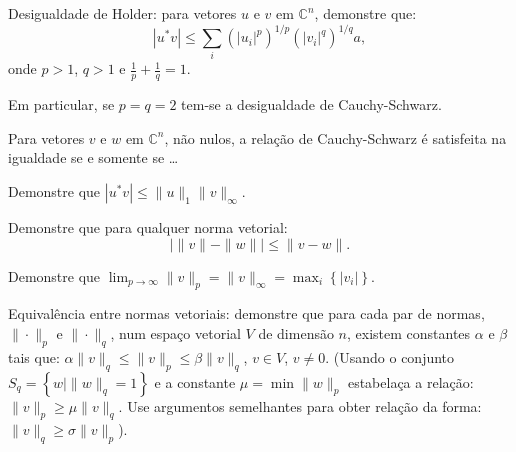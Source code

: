 \documentclass[a4paper,12pt, leqno, answers]{exam}
\begin{document}
\thispagestyle{headandfoot}
\begin{questions}
     Desigualdade de Holder: para vetores $u$ e $v$ em $\mathbb{C}^n$, demonstre que:
    \[
    | u^* v | \leq \sum_i \left( | u_i |^p \right)^{1/p} \left( | v_i |^q \right)^{1/q}a,
    \]
    onde $p > 1$, $q > 1$ e $\frac{1}{p} + \frac{1}{q} = 1$.
    \begin{solution}
        
    \end{solution}

    Em particular, se $p = q = 2$ tem-se a desigualdade de Cauchy-Schwarz.
    \begin{solution}
        
    \end{solution}

    \question Para vetores $v$ e $w$ em $\mathbb{C}^n$, n\~{a}o nulos, a rela\c{c}\~{a}o de Cauchy-Schwarz \'{e} satisfeita na igualdade se e somente se \dots
    \begin{solution}
        
    \end{solution}

    \question Demonstre que $| u^* v | \leq \| u \|_1 \| v \|_\infty$.
    \begin{solution}
        
    \end{solution}

    \question Demonstre que para qualquer norma vetorial:
    \[
    | \| v \| - \| w \| | \leq \| v - w \|.
    \]
    \begin{solution}
        
    \end{solution}

    \question Demonstre que $\lim_{p \rightarrow \infty} \| v \|_p = \| v \|_\infty = \max_i \left\{ | v_i | \right\}$.
    \begin{solution}
        
    \end{solution}

    \question Equival\^{e}ncia entre normas vetoriais: demonstre que para cada par de normas, $\| \cdot \|_p$ e $\| \cdot \|_q$, num espa\c{c}o vetorial $V$ de dimens\~{a}o $n$, existem constantes $\alpha$ e $\beta$ tais que: $\alpha \| v \|_q \leq \| v \|_p \leq \beta \| v \|_q$, $v \in V$, $v \neq 0$. (Usando o conjunto $S_q = \left\{ w \mid \| w \|_q = 1 \right\}$ e a constante $\mu = \min \| w \|_p$ estabela\c{c}a a rela\c{c}\~{a}o: $\| v \|_p \geq \mu \| v \|_q$. Use argumentos semelhantes para obter rela\c{c}\~{a}o da forma: $\| v \|_q \geq \sigma \| v \|_p$).
    \begin{solution}
        

\end{solution}
\end{questions}
\end{document}
